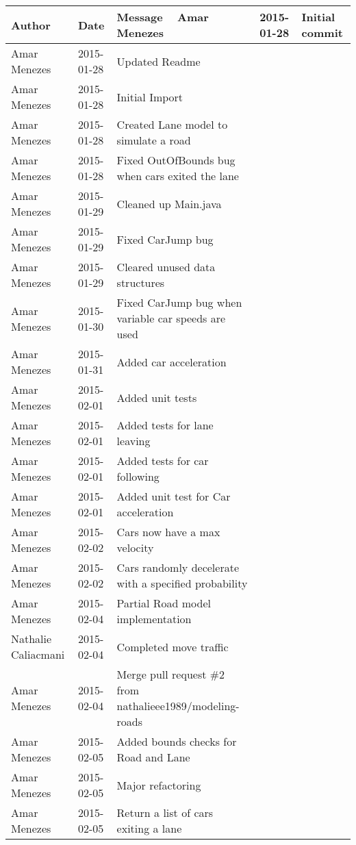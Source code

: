 \begin{center}
\begin{longtabu} to \textwidth {|
    X[4,l]|
    X[3,c]|
    X[8,l]|}
    \hline
    \textbf{Author} & \textbf{Date} & \textbf{Message} \ \hline
Amar Menezes & 2015-01-28 & Initial commit \\ \hline
Amar Menezes & 2015-01-28 & Updated Readme \\ \hline
Amar Menezes & 2015-01-28 & Initial Import \\ \hline
Amar Menezes & 2015-01-28 & Created Lane model to simulate a road \\ \hline
Amar Menezes & 2015-01-28 & Fixed OutOfBounds bug when cars exited the lane \\ \hline
Amar Menezes & 2015-01-29 & Cleaned up Main.java \\ \hline
Amar Menezes & 2015-01-29 & Fixed CarJump bug \\ \hline
Amar Menezes & 2015-01-29 & Cleared unused data structures \\ \hline
Amar Menezes & 2015-01-30 & Fixed CarJump bug when variable car speeds are used \\ \hline
Amar Menezes & 2015-01-31 & Added car acceleration \\ \hline
Amar Menezes & 2015-02-01 & Added unit tests \\ \hline
Amar Menezes & 2015-02-01 & Added tests for lane leaving \\ \hline
Amar Menezes & 2015-02-01 & Added tests for car following \\ \hline
Amar Menezes & 2015-02-01 & Added unit test for Car acceleration \\ \hline
Amar Menezes & 2015-02-02 & Cars now have a max velocity \\ \hline
Amar Menezes & 2015-02-02 & Cars randomly decelerate with a specified probability \\ \hline
Amar Menezes & 2015-02-04 & Partial Road model implementation \\ \hline
Nathalie Caliacmani & 2015-02-04 & Completed move traffic \\ \hline
Amar Menezes & 2015-02-04 & Merge pull request \#2 from nathalieee1989/modeling-roads \\ \hline
Amar Menezes & 2015-02-05 & Added bounds checks for Road and Lane \\ \hline
Amar Menezes & 2015-02-05 & Major refactoring \\ \hline
Amar Menezes & 2015-02-05 & Return a list of cars exiting a lane \\ \hline

\end{longtabu}
\end{center}
